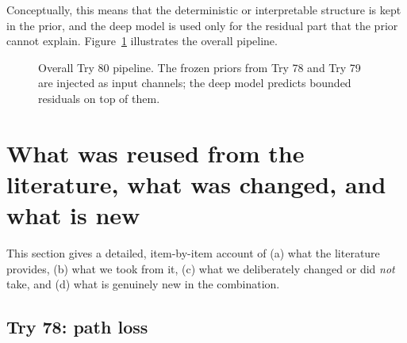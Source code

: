 \documentclass[11pt,a4paper]{article}
\begin{document}
Conceptually, this means that the deterministic or interpretable structure is
kept in the prior, and the deep model is used only for the residual part that
the prior cannot explain. Figure~\ref{fig:pipeline} illustrates the overall
pipeline.

\begin{figure}[H]
\centering
{}
\caption{Overall Try 80 pipeline. The frozen priors from Try 78 and Try 79
are injected as input channels; the deep model predicts bounded residuals on
top of them.}
\label{fig:pipeline}
\end{figure}

\section{What was reused from the literature, what was changed, and what is new}

This section gives a detailed, item-by-item account of (a) what the literature
provides, (b) what we took from it, (c) what we deliberately changed or did
\emph{not} take, and (d) what is genuinely new in the combination.

\subsection{Try 78: path loss}
\end{document}
